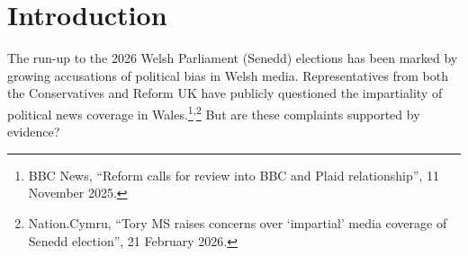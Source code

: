 \documentclass{article}
\begin{document}

\printAffiliationsAndNotice{}
\setcounter{footnote}{1} %

\begin{abstract}
Wales' political landscape has been marked by growing accusations of bias in Welsh media. This paper takes the first computational step toward testing those claims by examining Nation.Cymru, a prominent Welsh political news outlet. I use a two-stage natural language processing (NLP) pipeline: (1) a robustly optimized BERT approach (RoBERTa) bias detector for efficient bias discovery and (2) a large language model (LLM) for target-attributed sentiment classification of bias labels from (1). A primary analysis of 15,583 party mentions across 2022–2026 news articles finds that Reform UK attracts biased framing at twice the rate of Plaid Cymru and over three times as negative in mean sentiment ($p<0.001$). A secondary analysis across four parties across both news and opinion articles shows that Plaid Cymru is the outlier, receiving markedly more favourable framing than any other party. These findings provide evidence of measurable differential framing in a single Welsh political media outlet, supporting calls for a broader review of Welsh media coverage. Furthermore, the two-stage pipeline offers a low-cost, replicable framework for extending this analysis to other Welsh outlets, as well as media ecosystems outside of Wales.
\end{abstract}

\section{Introduction}

The run-up to the 2026 Welsh Parliament (Senedd) elections has been marked by growing accusations of political bias in Welsh media. Representatives from both the Conservatives and Reform UK have publicly questioned the impartiality of political news coverage in Wales.\footnote{BBC News, ``Reform calls for review into BBC and Plaid relationship'', 11 November 2025.}\textsuperscript{,}\footnote{Nation.Cymru, ``Tory MS raises concerns over `impartial' media coverage of Senedd election'', 21 February 2026.} But are these complaints supported by evidence?
\end{document}
